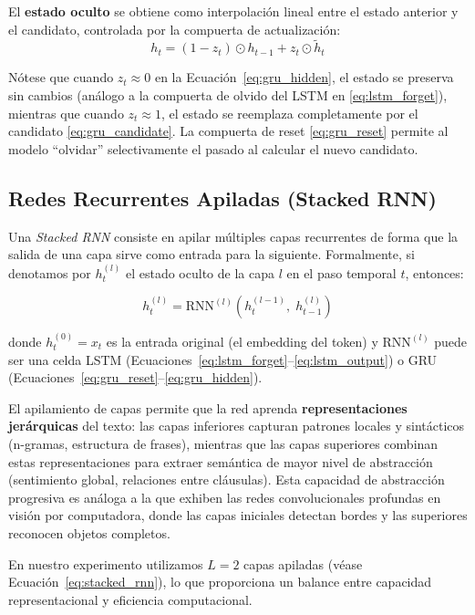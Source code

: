 El \textbf{estado oculto} se obtiene como interpolación lineal entre el estado anterior y el candidato, controlada por la compuerta de actualización:
\begin{equation}
    h_t = (1 - z_t) \odot h_{t-1} + z_t \odot \tilde{h}_t
    \label{eq:gru_hidden}
\end{equation}

Nótese que cuando $z_t \approx 0$ en la Ecuación~\eqref{eq:gru_hidden}, el estado se preserva sin cambios (análogo a la compuerta de olvido del LSTM en \eqref{eq:lstm_forget}), mientras que cuando $z_t \approx 1$, el estado se reemplaza completamente por el candidato \eqref{eq:gru_candidate}. La compuerta de reset \eqref{eq:gru_reset} permite al modelo ``olvidar'' selectivamente el pasado al calcular el nuevo candidato.

\subsection{Redes Recurrentes Apiladas (Stacked RNN)}

Una \emph{Stacked RNN} consiste en apilar múltiples capas recurrentes de forma que la salida de una capa sirve como entrada para la siguiente. Formalmente, si denotamos por $h_t^{(l)}$ el estado oculto de la capa $l$ en el paso temporal $t$, entonces:

\begin{equation}
    h_t^{(l)} = \text{RNN}^{(l)}(h_t^{(l-1)},\; h_{t-1}^{(l)})
    \label{eq:stacked_rnn}
\end{equation}

\noindent donde $h_t^{(0)} = x_t$ es la entrada original (el embedding del token) y $\text{RNN}^{(l)}$ puede ser una celda LSTM (Ecuaciones~\eqref{eq:lstm_forget}--\eqref{eq:lstm_output}) o GRU (Ecuaciones~\eqref{eq:gru_reset}--\eqref{eq:gru_hidden}).

El apilamiento de capas permite que la red aprenda \textbf{representaciones jerárquicas} del texto: las capas inferiores capturan patrones locales y sintácticos (n-gramas, estructura de frases), mientras que las capas superiores combinan estas representaciones para extraer semántica de mayor nivel de abstracción (sentimiento global, relaciones entre cláusulas). Esta capacidad de abstracción progresiva es análoga a la que exhiben las redes convolucionales profundas en visión por computadora, donde las capas iniciales detectan bordes y las superiores reconocen objetos completos.

En nuestro experimento utilizamos $L = 2$ capas apiladas (véase Ecuación~\eqref{eq:stacked_rnn}), lo que proporciona un balance entre capacidad representacional y eficiencia computacional.
